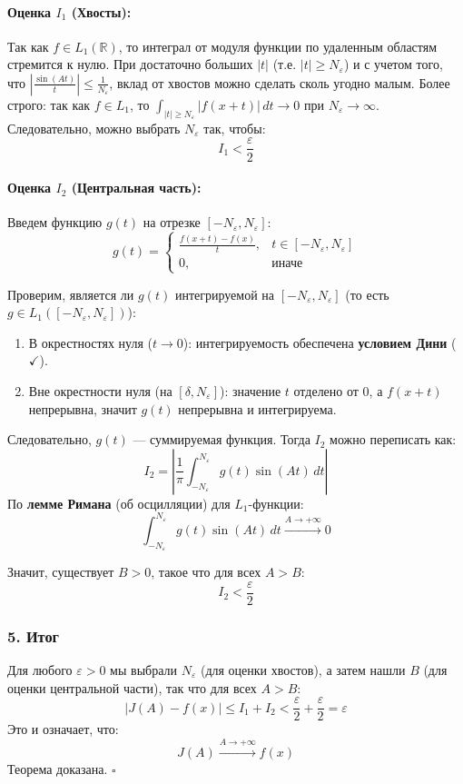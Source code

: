 \documentclass[12pt,a4paper,openany]{book}
\begin{document}
\paragraph{Оценка $I_1$ (Хвосты):}
Так как $f \in L_1(\mathbb{R})$, то интеграл от модуля функции по удаленным областям стремится к нулю.
При достаточно больших $|t|$ (т.е. $|t| \ge N_\varepsilon$) и с учетом того, что $\left| \frac{\sin(At)}{t} \right| \le \frac{1}{N_\varepsilon}$, вклад от хвостов можно сделать сколь угодно малым.
Более строго: так как $f \in L_1$, то $\int_{|t| \ge N_\varepsilon} |f(x+t)| \, dt \to 0$ при $N_\varepsilon \to \infty$.
Следовательно, можно выбрать $N_\varepsilon$ так, чтобы:
$$ I_1 < \frac{\varepsilon}{2} $$

\paragraph{Оценка $I_2$ (Центральная часть):}
Введем функцию $g(t)$ на отрезке $[-N_\varepsilon, N_\varepsilon]$:
$$ g(t) = \begin{cases} \frac{f(x+t) - f(x)}{t}, & t \in [-N_\varepsilon, N_\varepsilon] \\ 0, & \text{иначе} \end{cases} $$

Проверим, является ли $g(t)$ интегрируемой на $[-N_\varepsilon, N_\varepsilon]$ (то есть $g \in L_1([-N_\varepsilon, N_\varepsilon])$):
\begin{enumerate}
    \item В окрестностях нуля ($t \to 0$): интегрируемость обеспечена \textbf{условием Дини} ($\checkmark$).
    \item Вне окрестности нуля (на $[\delta, N_\varepsilon]$): значение $t$ отделено от $0$, а $f(x+t)$ непрерывна, значит $g(t)$ непрерывна и интегрируема.
\end{enumerate}
Следовательно, $g(t)$ — суммируемая функция. Тогда $I_2$ можно переписать как:
$$ I_2 = \left| \frac{1}{\pi} \int_{-N_\varepsilon}^{N_\varepsilon} g(t) \sin(At) \, dt \right| $$
По \textbf{лемме Римана} (об осцилляции) для $L_1$-функции:
$$ \int_{-N_\varepsilon}^{N_\varepsilon} g(t) \sin(At) \, dt \xrightarrow{A \to +\infty} 0 $$

Значит, существует $B > 0$, такое что для всех $A > B$:
$$ I_2 < \frac{\varepsilon}{2} $$

\subsubsection*{5. Итог}
Для любого $\varepsilon > 0$ мы выбрали $N_\varepsilon$ (для оценки хвостов), а затем нашли $B$ (для оценки центральной части), так что для всех $A > B$:
$$ |J(A) - f(x)| \le I_1 + I_2 < \frac{\varepsilon}{2} + \frac{\varepsilon}{2} = \varepsilon $$
Это и означает, что:
$$ J(A) \xrightarrow{A \to +\infty} f(x) $$
Теорема доказана. $\square$
\end{document}
